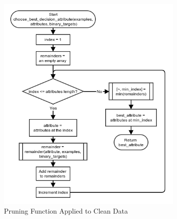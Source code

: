 \documentclass[11pt,a4paper]{article}
\begin{document}
\begin{figure}[!ht]
	\centering
	\begin{subfigure}[b]{0.495\textwidth}
		\includegraphics[width=\textwidth]{images/flow_chart/choose_best_decision_attribute.png}
     	\caption{Pruning Function Applied to Clean Data}
     	\label{fig:pruningClean}
    \end{subfigure}
	\begin{subfigure}[b]{0.495\textwidth}

\end{subfigure}
\end{figure}
\end{document}
